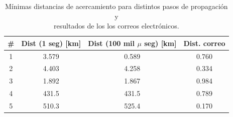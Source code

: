 \begin{table}[!h]
\caption{ARxCODE a partir de correos electr\'onicos\\ Propagaciones cada 100.000 microsegundos - (Radio de colisi\'on $r_{a}=0.01$ km)}
\label{tab:mails100mseg}
\end{table}

\begin{table}[!h]
\caption{M\'inimas distancias de acercamiento para distintos pasos de propagaci\'on y\\ resultados de los los correos electr\'onicos.}
\begin{tabular}{cccc}
 \hline \hline
  \rowcolor{lightgray}
 \# & Dist (1 seg) [km] & Dist (100 mil $\mu$ seg) [km] & Dist. correo\\
 \hline \hline
 1 & 3.579 &  0.589 &  0.760  \\
 
 2 & 4.403 & 4.258 & 0.334  \\
 
 3 & 1.892 & 1.867 & 0.984 \\
 
 4 & 431.5 & 431.5 & 0.789 \\
 
 5 & 510.3 & 525.4 & 0.170 \\
 \hline
\end{tabular} %

\label{tab:mailsMinD}
\end{table}

